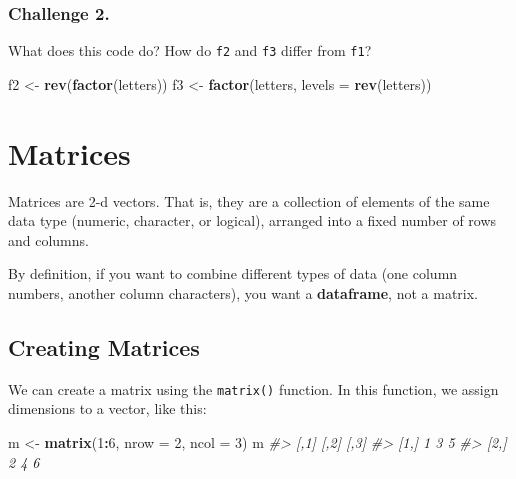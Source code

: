 \documentclass[]{book}
\newenvironment{Shaded}{\begin{snugshade}}{\end{snugshade}}
\newcommand{\KeywordTok}[1]{\textcolor[rgb]{0.13,0.29,0.53}{\textbf{#1}}}
\newcommand{\DataTypeTok}[1]{\textcolor[rgb]{0.13,0.29,0.53}{#1}}
\newcommand{\DecValTok}[1]{\textcolor[rgb]{0.00,0.00,0.81}{#1}}
\newcommand{\StringTok}[1]{\textcolor[rgb]{0.31,0.60,0.02}{#1}}
\newcommand{\CommentTok}[1]{\textcolor[rgb]{0.56,0.35,0.01}{\textit{#1}}}
\newcommand{\OperatorTok}[1]{\textcolor[rgb]{0.81,0.36,0.00}{\textbf{#1}}}
\newcommand{\NormalTok}[1]{#1}
\begin{document}
\subsubsection*{Challenge 2.}\label{challenge-2.-2}

What does this code do? How do \texttt{f2} and \texttt{f3} differ from
\texttt{f1}?

\begin{Shaded}
\begin{Highlighting}[]
\NormalTok{f2 <-}\StringTok{ }\KeywordTok{rev}\NormalTok{(}\KeywordTok{factor}\NormalTok{(letters))}
\NormalTok{f3 <-}\StringTok{ }\KeywordTok{factor}\NormalTok{(letters, }\DataTypeTok{levels =} \KeywordTok{rev}\NormalTok{(letters))}
\end{Highlighting}
\end{Shaded}

\hypertarget{matrices}{\section{Matrices}\label{matrices}}

Matrices are 2-d vectors. That is, they are a collection of elements of
the same data type (numeric, character, or logical), arranged into a
fixed number of rows and columns.

By definition, if you want to combine different types of data (one
column numbers, another column characters), you want a
\textbf{dataframe}, not a matrix.

\subsection{Creating Matrices}\label{creating-matrices}

We can create a matrix using the \texttt{matrix()} function. In this
function, we assign dimensions to a vector, like this:

\begin{Shaded}
\begin{Highlighting}[]
\NormalTok{m <-}\StringTok{ }\KeywordTok{matrix}\NormalTok{(}\DecValTok{1}\OperatorTok{:}\DecValTok{6}\NormalTok{, }\DataTypeTok{nrow =} \DecValTok{2}\NormalTok{, }\DataTypeTok{ncol =} \DecValTok{3}\NormalTok{)}
\NormalTok{m}
\CommentTok{#>      [,1] [,2] [,3]}
\CommentTok{#> [1,]    1    3    5}
\CommentTok{#> [2,]    2    4    6}
\end{Highlighting}
\end{Shaded}
\end{document}

